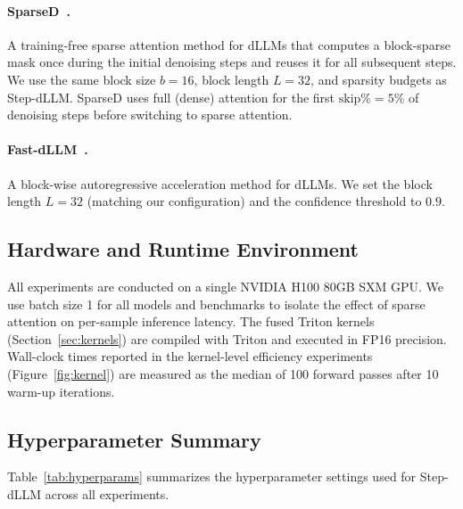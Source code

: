 \documentclass{article}
\theoremstyle{plain}
\theoremstyle{definition}
\theoremstyle{remark}
\begin{document}
\paragraph{SparseD~\citep{wang2025sparsed}.}
A training-free sparse attention method for dLLMs that computes a block-sparse mask once during the initial denoising steps and reuses it for all subsequent steps. We use the same block size $b = 16$, block length $L = 32$, and sparsity budgets as Step-dLLM. SparseD uses full (dense) attention for the first $\text{skip}\% = 5\%$ of denoising steps before switching to sparse attention.

\paragraph{Fast-dLLM~\citep{wu2025fastdllm}.}
A block-wise autoregressive acceleration method for dLLMs. We set the block length $L = 32$ (matching our configuration) and the confidence threshold to $0.9$.

\subsection{Hardware and Runtime Environment}
\label{app:hardware}

All experiments are conducted on a single NVIDIA H100 80GB SXM GPU. We use batch size 1 for all models and benchmarks to isolate the effect of sparse attention on per-sample inference latency. The fused Triton kernels (Section~\ref{sec:kernels}) are compiled with Triton and executed in FP16 precision. Wall-clock times reported in the kernel-level efficiency experiments (Figure~\ref{fig:kernel}) are measured as the median of 100 forward passes after 10 warm-up iterations.

\subsection{Hyperparameter Summary}
\label{app:hyperparams}

Table~\ref{tab:hyperparams} summarizes the hyperparameter settings used for Step-dLLM across all experiments.
\end{document}
